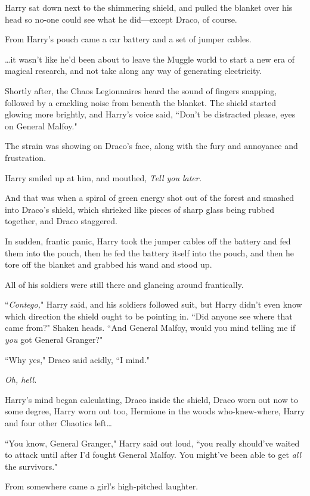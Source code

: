 Harry sat down next to the shimmering shield, and pulled the blanket over his head so no-one could see what he did—except Draco, of course.

From Harry's pouch came a car battery and a set of jumper cables.

{\ldots}it wasn't like he'd been about to leave the Muggle world to start a new era of magical research, and not take along any way of generating electricity.

Shortly after, the Chaos Legionnaires heard the sound of fingers snapping, followed by a crackling noise from beneath the blanket. The shield started glowing more brightly, and Harry's voice said, ``Don't be distracted please, eyes on General Malfoy."

The strain was showing on Draco's face, along with the fury and annoyance and frustration.

Harry smiled up at him, and mouthed, \emph{Tell you later.}

And that was when a spiral of green energy shot out of the forest and smashed into Draco's shield, which shrieked like pieces of sharp glass being rubbed together, and Draco staggered.

In sudden, frantic panic, Harry took the jumper cables off the battery and fed them into the pouch, then he fed the battery itself into the pouch, and then he tore off the blanket and grabbed his wand and stood up.

All of his soldiers were still there and glancing around frantically.

``\emph{Contego,}" Harry said, and his soldiers followed suit, but Harry didn't even know which direction the shield ought to be pointing in. ``Did anyone see where that came from?" Shaken heads. ``And General Malfoy, would you mind telling me if \emph{you} got General Granger?"

``Why yes," Draco said acidly, ``I mind."

\emph{Oh, hell.}

Harry's mind began calculating, Draco inside the shield, Draco worn out now to some degree, Harry worn out too, Hermione in the woods who-knew-where, Harry and four other Chaotics left{\ldots}

``You know, General Granger," Harry said out loud, ``you really should've waited to attack until after I'd fought General Malfoy. You might've been able to get \emph{all} the survivors."

From somewhere came a girl's high-pitched laughter.

